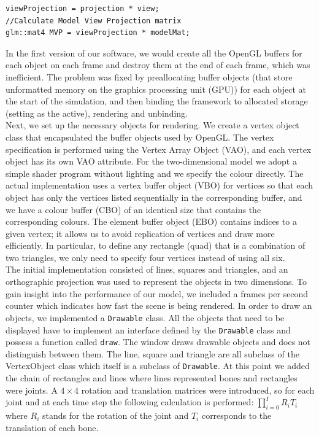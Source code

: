 \documentclass[paper=a4, fontsize=11pt]{scrartcl} %
\numberwithin{equation}{section} %
\numberwithin{figure}{section} %
\numberwithin{table}{section} %
\begin{document}
\lstset{
  frame=top,frame=bottom,
  basicstyle=\small\normalfont\sffamily,
  }
\begin{lstlisting}[float,caption=Renderer MVP calculation, label={lst:renderer}]
viewProjection = projection * view;
//Calculate Model View Projection matrix
glm::mat4 MVP = viewProjection * modelMat;
\end{lstlisting}


In the first version of our software, we would create all the OpenGL buffers for each object on each frame and destroy them at the end of each frame, which was inefficient. The problem was fixed by preallocating buffer objects (that store unformatted memory on the graphics processing unit (GPU)) for each object at the start of the simulation, and then binding the framework to allocated storage (setting as the active), rendering and unbinding. \\

Next, we set up the necessary objects for rendering. We create a vertex object class that encapsulated the buffer objects used by OpenGL. The vertex specification is performed using the Vertex Array Object (VAO), and each vertex object has its own VAO attribute. For the two-dimensional model we adopt a simple shader program without lighting and we specify the colour directly. The actual implementation uses a vertex buffer object (VBO) for vertices so that each object has only the vertices listed sequentially in the corresponding buffer, and we have a colour buffer (CBO) of an identical size that contains the corresponding colours. The element buffer object (EBO) contains indices to a given vertex; it allows us to avoid replication of vertices and draw more efficiently. In particular, to define any rectangle (quad) that is a combination of two triangles, we only need to specify four vertices instead of using all six. \\

The initial implementation consisted of lines, squares and triangles, and an orthographic projection was used to represent the objects in two dimensions. To gain insight into the performance of our model, we included a frames per second counter which indicates how fast the scene is being rendered. In order to draw an objects, we implemented a \texttt{Drawable} class. All the objects that need to be displayed have to implement an interface defined by the \texttt{Drawable} class and possess a function called \texttt{draw}. The window draws drawable objects and does not distinguish between them. The line, square and triangle are all subclass of the VertexObject class which itself is a subclass of \texttt{Drawable}. At this point we added the chain of rectangles and lines where lines represented bones and rectangles were joints. A \(4 \times 4\) rotation and translation matrices were introduced, so for each joint and at each time step the following calculation is performed:  \(\prod_{i=0}^I R_i T_i\) where \(R_i\) stands for the rotation of the joint and \(T_i\) corresponds to the translation of each bone. \\
\end{document}
